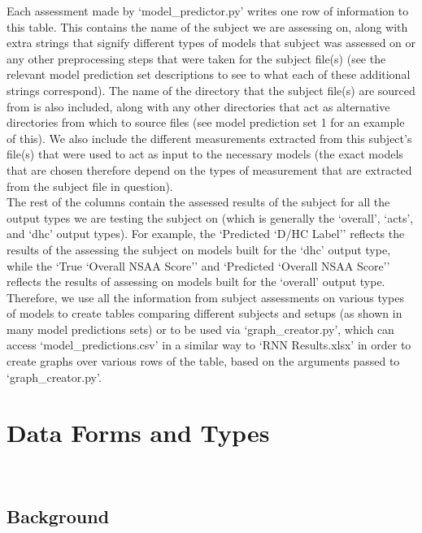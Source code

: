 \documentclass[12pt,twoside]{report}
\begin{document}
\quad Each assessment made by ‘model\_predictor.py’ writes one row of information to this table. This contains the name of the subject we are assessing on, along with extra strings that signify different types of models that subject was assessed on or any other preprocessing steps that were taken for the subject file(s) (see the relevant model prediction set descriptions to see to what each of these additional strings correspond). The name of the directory that the subject file(s) are sourced from is also included, along with any other directories that act as alternative directories from which to source files (see model prediction set 1 for an example of this). We also include the different measurements extracted from this subject’s file(s) that were used to act as input to the necessary models (the exact models that are chosen therefore depend on the types of measurement that are extracted from the subject file in question).\\

\quad The rest of the columns contain the assessed results of the subject for all the output types we are testing the subject on (which is generally the ‘overall’, ‘acts’, and ‘dhc’ output types). For example, the ‘Predicted ‘D/HC Label’’ reflects the results of the assessing the subject on models built for the ‘dhc’ output type, while the ‘True ‘Overall NSAA Score’’ and ‘Predicted ‘Overall NSAA Score’’ reflects the results of assessing on models built for the ‘overall’ output type. Therefore, we use all the information from subject assessments on various types of models to create tables comparing different subjects and setups (as shown in many model predictions sets) or to be used via ‘graph\_creator.py’, which can access ‘model\_predictions.csv’ in a similar way to ‘RNN Results.xlsx’ in order to create graphs over various rows of the table, based on the arguments passed to ‘graph\_creator.py’.




\chapter{Data Forms and Types\\~\\}

\section{Background}
\end{document}
